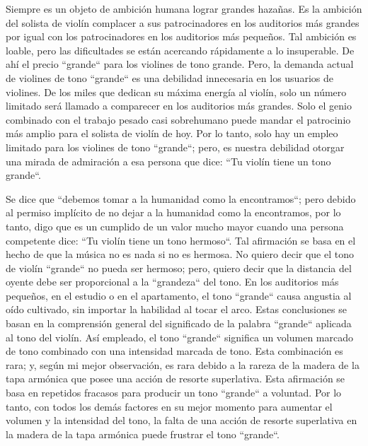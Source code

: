 \documentclass[12pt]{book}
\begin{document}
Siempre es un objeto de ambición humana lograr grandes hazañas. Es la ambición del solista de violín complacer a sus patrocinadores en los auditorios más grandes por igual con los patrocinadores en los auditorios más pequeños. Tal ambición es loable, pero las dificultades se están acercando rápidamente a lo insuperable. De ahí el precio ``grande`` para los violines de tono grande. Pero, la demanda actual de violines de tono ``grande`` es una debilidad innecesaria en los usuarios de violines. De los miles que dedican su máxima energía al violín, solo un número limitado será llamado a comparecer en los auditorios más grandes. Solo el genio combinado con el trabajo pesado casi sobrehumano puede mandar el patrocinio más amplio para el solista de violín de hoy. Por lo tanto, solo hay un empleo limitado para los violines de tono ``grande``; pero, es nuestra debilidad otorgar una mirada de admiración a esa persona que dice: ``Tu violín tiene un tono grande``.

Se dice que ``debemos tomar a la humanidad como la encontramos``; pero debido al permiso implícito de no dejar a la humanidad como la encontramos, por lo tanto, digo que es un cumplido de un valor mucho mayor cuando una persona competente dice: ``Tu violín tiene un tono hermoso``. Tal afirmación se basa en el hecho de que la música no es nada si no es hermosa. No quiero decir que el tono de violín ``grande`` no pueda ser hermoso; pero, quiero decir que la distancia del oyente debe ser proporcional a la ``grandeza`` del tono. En los auditorios más pequeños, en el estudio o en el apartamento, el tono ``grande`` causa angustia al oído cultivado, sin importar la habilidad al tocar el arco. Estas conclusiones se basan en la comprensión general del significado de la palabra ``grande`` aplicada al tono del violín. Así empleado, el tono ``grande`` significa un volumen marcado de tono combinado con una intensidad marcada de tono. Esta combinación es rara; y, según mi mejor observación, es rara debido a la rareza de la madera de la tapa armónica que posee una acción de resorte superlativa. Esta afirmación se basa en repetidos fracasos para producir un tono ``grande`` a voluntad. Por lo tanto, con todos los demás factores en su mejor momento para aumentar el volumen y la intensidad del tono, la falta de una acción de resorte superlativa en la madera de la tapa armónica puede frustrar el tono ``grande``.
\end{document}
